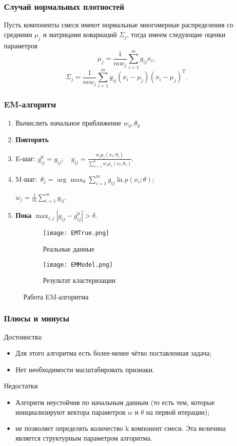 \documentclass[12pt,pdf,notheorems]{beamer}
\begin{document}
\begin{frame}\frametitle{Случай нормальных плотностей}
Пусть компоненты смеси имеют нормальные многомерные распределения со средними $\mu_j$ и матрицами ковариаций $\Sigma_j$, тогда 
имеем следующие оценки параметров
	$$\mu_j = \frac{1}{mw_j} \sum_{i=1}^m g_{ij} x_i,$$
	$$\Sigma_j = \frac{1}{mw_j} \sum_{i=1}^m g_{ij} (x_i - \mu_j) (x_i - \mu_j)^{\mathrm{T}}.$$
\end{frame}

\begin{frame}\frametitle{EM-алгоритм}
	\begin{enumerate}
		\item Вычислить начальное приближение $w_y, \theta_y$
		\item \textbf{Повторять}
		\item \quad E-шаг: $g_{ij}^0 = g_{ij}; \quad g_{ij} = \frac{w_j p_j(x_i; \theta_j)}{\sum_{s=1}^k w_{s} p_{s}(x_i; \theta_s) }$.
		\item \quad M-шаг:~$\theta_j = \arg \max_\theta \sum_{i=1}^m g_{ij} \ln p(x_i; \theta);$
		
			\quad  $w_j = \frac{1}{m} \sum_{i=1}^m g_{ij}$.
		\item \textbf{Пока} $\max_{i,j} |g_{ij} - g_{ij}^0| > \delta$.
	\end{enumerate}
\end{frame}

\begin{frame}
	\begin{figure}
		\centering
		\begin{subfigure}{0.4\linewidth}
			\texttt{[image: EMTrue.png]}
			\caption{Реальные данные}
		\end{subfigure}
		\begin{subfigure}{0.5\linewidth}
			\texttt{[image: EMModel.png]}
			\caption{Результат кластеризации}
		\end{subfigure}
			\caption{Работа EM-алгоритма}
	\end{figure}
\end{frame}

\begin{frame}\frametitle{Плюсы и минусы}
	Достоинства:
	\begin{itemize}
	\item Для этого алгоритма есть более-менее чётко поставленная задача;
	\item Нет необходимости масштабировать признаки.
	\end{itemize}
	
	Недостатки
	\begin{itemize}
	\item Алгоритм неустойчив по начальным данным (то есть тем, которые инициализируют вектора параметров $w$ и $\theta$ на первой итерации);
	\item не позволяет определять количество k компонент смеси. Эта величина является структурным параметром алгоритма.
	\end{itemize}
\end{frame}
\end{document}
